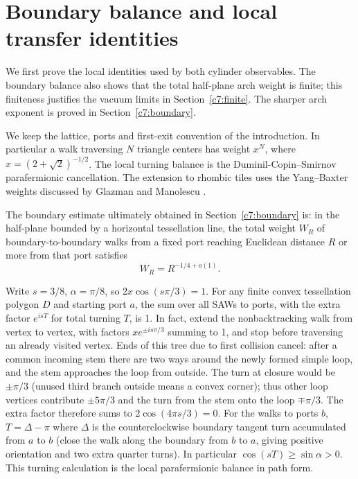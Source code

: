 \section{Boundary balance and local transfer identities}\label{j:local}

We first prove the local identities used by both cylinder observables. The boundary balance also shows that the total half-plane arch weight is finite; this finiteness justifies the vacuum limits in Section~\ref{c7:finite}. The sharper arch exponent is proved in Section~\ref{c7:boundary}.

We keep the lattice, ports and first-exit convention of the introduction.
In particular a walk traversing $N$ triangle centers has weight $x^N$,
where $x=(2+\sqrt2)^{-1/2}$. The local turning balance is the
Duminil-Copin--Smirnov parafermionic cancellation. The extension to
rhombic tiles uses the Yang--Baxter weights discussed by Glazman and
Manolescu \cite{DuminilCopinSmirnov2012,GlazmanManolescu2017}.

The boundary estimate ultimately obtained in Section~\ref{c7:boundary} is: in the half-plane bounded by a horizontal tessellation line, the total weight $W_R$ of boundary-to-boundary walks from a fixed port reaching Euclidean distance $R$ or more from that port satisfies
\[
W_R=R^{-1/4+o(1)}.
\]

\label{j:convex-balance}
Write $s=3/8$, $\alpha=\pi/8$, so $2x\cos(s\pi/3)=1$. For any finite convex tessellation polygon $D$ and starting port $a$, the sum over all SAWs to ports, with the extra factor $e^{isT}$ for total turning $T$, is 1. In fact, extend the nonbacktracking walk from vertex to vertex, with factors $xe^{\pm is\pi/3}$ summing to 1, and stop before traversing an already visited vertex. Ends of this tree due to first collision cancel: after a common incoming stem there are two ways around the newly formed simple loop, and the stem approaches the loop from outside. The turn at closure would be $\pm\pi/3$ (unused third branch outside means a convex corner); thus other loop vertices contribute $\pm5\pi/3$ and the turn from the stem onto the loop $\mp\pi/3$. The extra factor therefore sums to $2\cos(4\pi s/3)=0$. For the walks to ports $b$, $T=\Delta-\pi$ where $\Delta$ is the counterclockwise boundary tangent turn accumulated from $a$ to $b$ (close the walk along the boundary from $b$ to $a$, giving positive orientation and two extra quarter turns). In particular $\cos(sT)\ge\sin\alpha>0$. This turning calculation is the local parafermionic balance in path form. \cite{DuminilCopinSmirnov2012}


